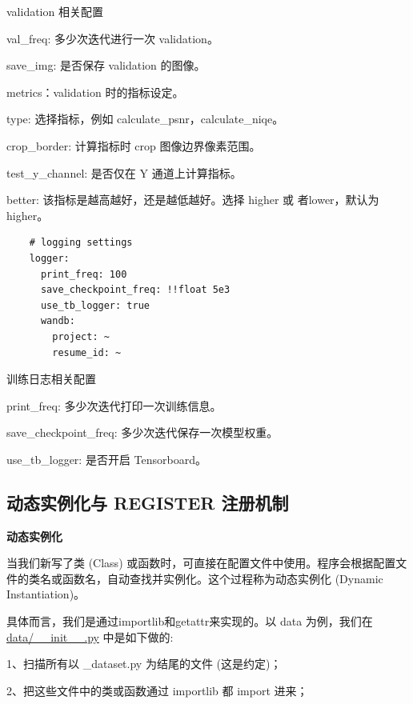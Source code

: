 \documentclass[../main.tex]{subfiles}
\begin{document}
    \begin{exampleBox}[righthand ratio=0.00, sidebyside, sidebyside align=center, lower separated=false]{validation 相关配置}

    val\_freq: 多少次迭代进行一次 validation。

    save\_img: 是否保存 validation 的图像。

    metrics：validation 时的指标设定。

    type: 选择指标，例如 calculate\_psnr，calculate\_niqe。

    crop\_border: 计算指标时 crop 图像边界像素范围。

    test\_y\_channel: 是否仅在 Y 通道上计算指标。

    better: 该指标是越高越好，还是越低越好。选择 higher 或 者lower，默认为 higher。
    \end{exampleBox}
    \begin{verbatim}
    # logging settings
    logger:
      print_freq: 100
      save_checkpoint_freq: !!float 5e3
      use_tb_logger: true
      wandb:
        project: ~
        resume_id: ~
    \end{verbatim}
    \begin{exampleBox}[righthand ratio=0.00, sidebyside, sidebyside align=center, lower separated=false]{训练日志相关配置}

    print\_freq: 多少次迭代打印一次训练信息。

    save\_checkpoint\_freq: 多少次迭代保存一次模型权重。

    use\_tb\_logger: 是否开启 Tensorboard。
    \end{exampleBox}

    \subsection{动态实例化与 REGISTER 注册机制}
    \textbf{动态实例化}

    当我们新写了类 (Class) 或函数时，可直接在配置文件中使用。程序会根据配置文件的类名或函数名，自动查找并实例化。这个过程称为动态实例化 (Dynamic Instantiation)。

    具体而言，我们是通过importlib和getattr来实现的。以 data 为例，我们在 \href{https://github.com/XPixelGroup/BasicSR/blob/master/basicsr/data/__init__.py}{data/\_\_init\_\_.py} 中是如下做的:

    1、扫描所有以 \_dataset.py 为结尾的文件 (这是约定)；

    2、把这些文件中的类或函数通过 importlib 都 import 进来；
\end{document}
